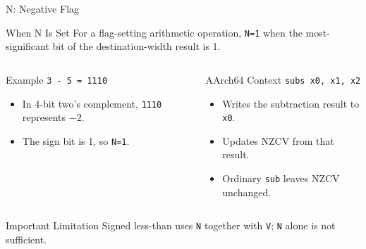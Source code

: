 \documentclass[aspectratio=169,11pt,t]{beamer}
\newcommand{\code}[1]{\texttt{#1}}
\begin{document}
\begin{frame}{N: Negative Flag}
\vspace{-0.2cm}
\begin{block}{When N Is Set}
For a flag-setting arithmetic operation, \code{N=1} when the most-significant bit of the destination-width result is 1.
\end{block}
\begin{columns}[T,onlytextwidth]
\begin{block}{Example}
\large
\hspace{1.2cm}\code{3 - 5 = 1110}
\normalsize
\begin{itemize}
\item In 4-bit two's complement, \code{1110} represents $-2$.
\item The sign bit is 1, so \code{N=1}.
\end{itemize}
\end{block}
\begin{block}{AArch64 Context}
\large
\hspace{1.1cm}\code{subs x0, x1, x2}
\normalsize
\begin{itemize}
\item Writes the subtraction result to \code{x0}.
\item Updates NZCV from that result.
\item Ordinary \code{sub} leaves NZCV unchanged.
\end{itemize}
\end{block}
\end{columns}
\vspace{-0.05cm}
\begin{block}{Important Limitation}
Signed less-than uses \code{N} together with \code{V}; \code{N} alone is not sufficient.
\end{block}
\end{frame}










\end{document}
